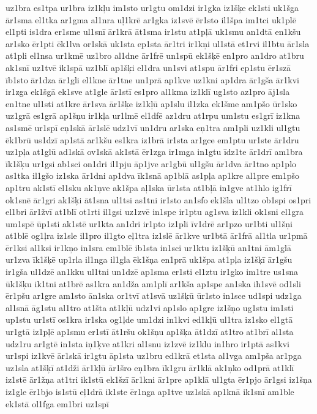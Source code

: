{uz1bra
es1tpa
ur1bra
iz1kļu
im1sto
ur1gtu
om1dzi
ir1gka
iz1šķe
ek1sti
uk1šga
ār1sma
el1tka
ar1gma
al1nra
uļ1krē
ar1gka
iz1svē
ēr1sto
il1špa
im1tci
uk1plē
el1pti
is1dra
er1sme
ul1snī
ār1krā
āt1sma
ir1stu
at1pļā
uk1smu
an1dtā
en1kšu
ar1sko
ēr1pti
ēk1lva
or1skā
uk1sta
ep1sta
ār1tri
ir1kņi
ul1stā
et1rvi
il1btu
ār1sla
at1pli
el1nsa
ur1kmē
uz1bro
al1dne
ār1frē
un1spū
ek1šķē
en1pro
an1dro
at1bru
ak1snī
uz1tvē
ik1spā
uz1blī
ap1šķi
el1dra
un1svi
at1spu
ār1fri
ep1stu
ēr1szā
īb1sto
ār1dza
ār1gli
el1kne
ār1tne
un1prā
ap1kve
uz1kni
ap1dra
ār1gša
ār1kvi
ir1zga
ek1šgā
ek1sve
at1gle
ār1stī
es1pro
al1kma
iz1klī
ug1sto
az1pro
āj1sla
en1tne
ul1sti
at1kre
ār1sva
ār1šķe
iz1kļū
ap1slu
il1zka
ek1šme
am1pšo
ūr1sko
uz1grā
es1grā
ap1šņu
ir1kļa
ur1lmē
el1dfē
az1dru
at1rpu
um1stu
es1grī
iz1kna
as1smē
ur1spī
eņ1skā
ār1slē
udz1vī
un1dru
ar1ska
eņ1tra
am1pli
uz1kli
ul1gtu
ēk1brū
us1dzī
ap1stā
ar1kšu
es1kra
iz1brā
ir1sta
ar1gce
em1ptu
ur1ste
ār1dru
uz1pļa
at1glū
ad1skā
ov1skā
ak1stā
ēr1zga
ir1mga
in1gtu
īdz1te
ār1drī
am1bra
īk1šķu
ur1gsi
ab1sci
on1dri
il1pju
āp1jve
ar1gbū
ul1gšu
ār1dva
ār1tno
ap1plo
as1tka
il1gšo
iz1ska
ār1dni
ap1dva
īk1snā
ap1blā
as1pļa
ap1kre
al1pre
em1pšo
ap1tru
ak1stī
el1sku
ak1ņve
ak1špa
aļ1ska
ūr1sta
at1bļā
in1gve
at1hlo
ig1frī
ok1snē
ār1gri
ak1šķi
āt1sna
ul1tsi
as1tni
ir1sto
an1sfo
ek1šla
ul1tzo
ob1spi
os1pri
el1bri
ār1žvī
at1blī
ot1rti
il1gsi
uz1zvē
in1spe
ir1ptu
ag1sva
iz1kli
ok1sni
el1gra
um1spē
ūp1sti
ak1stē
ur1kta
an1dri
ir1pto
iz1pli
īv1drē
ar1pzo
ur1bti
ul1šņi
at1blē
og1ļra
iz1sle
il1pro
il1gto
eļ1tra
iz1slē
ār1kve
ur1btā
ār1frā
al1tla
ur1pmā
ēr1ksi
al1ksi
ir1kņo
in1sra
em1blē
ib1sta
in1sci
ur1ktu
iz1šķū
an1tni
ām1glā
ur1zva
īk1šķē
up1rla
il1nga
il1gla
ēk1šņa
en1prā
uk1špa
at1pļa
iz1šķī
ār1gšu
ir1gša
ul1dzē
an1kku
ul1tni
un1dzē
ap1sma
er1sti
el1ztu
ir1gko
im1tre
us1sna
ūk1šķu
ik1tni
at1brē
as1kra
an1dža
am1plī
ar1kša
ap1spe
an1ska
ih1svē
od1sli
ēr1pšu
ar1gre
am1sto
ān1ska
or1tvī
at1svā
uz1šķū
ūr1sto
in1sce
ud1spi
udz1ga
al1snā
āg1stu
al1tro
at1šta
at1kļū
udz1vi
ap1slo
ap1gre
iz1šņo
ug1stu
im1sti
up1stu
ur1stī
os1kra
ir1ska
og1ļde
um1dzi
in1kvi
ed1kļū
ul1tra
iz1sko
el1gtā
ur1gtā
iz1pļē
ap1smu
er1stī
āt1ršu
ok1šņu
ap1šķa
āt1dzī
at1tro
at1brī
al1sta
udz1ru
ar1gtē
in1sta
iņ1ķve
at1kri
al1snu
iz1zvē
iz1klu
in1hro
ir1ptā
as1kvi
ur1spi
iz1kvē
ār1skā
ir1gtu
āp1sta
uz1bru
ed1krā
et1sta
al1vga
am1pša
ar1pga
uz1sla
at1šķī
at1dži
ār1kļū
ār1šro
eņ1bra
īk1gru
ār1klā
ak1ņko
od1prā
at1klī
iz1stē
ār1žņa
at1tri
ik1stū
ek1šzī
ār1kni
ār1pre
ap1klā
ul1gta
ēr1pjo
ār1gsi
iz1šņa
iz1gle
ēr1bjo
is1stū
eļ1drā
ik1ste
ēr1nga
ap1tve
uz1skā
ap1knā
ik1snī
am1ble
ek1stā
ol1fga
em1bri
uz1spī
}
